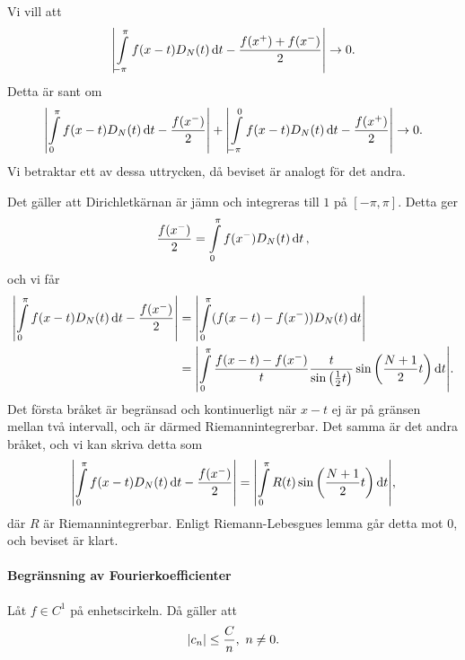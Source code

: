 \proof
Vi vill att
\begin{align*}
	\abs{\int\limits_{-\pi}^{\pi}f(x - t)D_{N}(t)\dd{t} - \frac{f(x^{+}) + f(x^{-})}{2}}\to 0.
\end{align*}
Detta är sant om
\begin{align*}
	\abs{\int\limits_{0}^{\pi}f(x - t)D_{N}(t)\dd{t} - \frac{f(x^{-})}{2}} + \abs{\int\limits_{-\pi}^{0}f(x - t)D_{N}(t)\dd{t} - \frac{f(x^{+})}{2}} \to 0.
\end{align*}
Vi betraktar ett av dessa uttrycken, då beviset är analogt för det andra.

Det gäller att Dirichletkärnan är jämn och integreras till $1$ på $[-\pi, \pi]$. Detta ger
\begin{align*}
	\frac{f(x^{-})}{2} = \int\limits_{0}^{\pi}f(x^{-})D_{N}(t)\dd{t},
\end{align*}
och vi får
\begin{align*}
	\abs{\int\limits_{0}^{\pi}f(x - t)D_{N}(t)\dd{t} - \frac{f(x^{-})}{2}} &= \abs{\int\limits_{0}^{\pi}(f(x - t) - f(x^{-}))D_{N}(t)\dd{t}} \\
	                                                                 &= \abs{\int\limits_{0}^{\pi}\frac{f(x - t) - f(x^{-})}{t}\frac{t}{\sin{\left(\frac{1}{2}t\right)}}\sin{\left(\frac{N + 1}{2}t\right)}\dd{t}}.
\end{align*}
Det första bråket är begränsad och kontinuerligt när $x - t$ ej är på gränsen mellan två intervall, och är därmed Riemannintegrerbar. Det samma är det andra bråket, och vi kan skriva detta som
\begin{align*}
	\abs{\int\limits_{0}^{\pi}f(x - t)D_{N}(t)\dd{t} - \frac{f(x^{-})}{2}} = \abs{\int\limits_{0}^{\pi}R(t)\sin{\left(\frac{N + 1}{2}t\right)}\dd{t}},
\end{align*}
där $R$ är Riemannintegrerbar. Enligt Riemann-Lebesgues lemma går detta mot $0$, och beviset är klart.

\paragraph{Begränsning av Fourierkoefficienter}
Låt $f\in C^{1}$ på enhetscirkeln. Då gäller att
\begin{align*}
	\abs{c_{n}} \leq \frac{C}{n},\ n \neq 0.
\end{align*}

